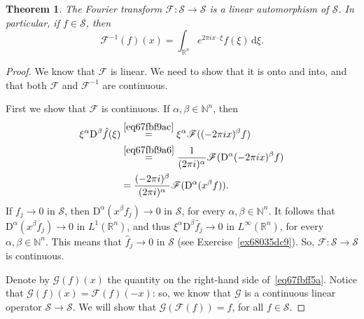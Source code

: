 \documentclass[a4paper,9pt]{amsart}
\newcommand{\scr}[1]{\mathscr{#1}}
\newcommand{\N}{\mathbb{N}}	%
\newcommand{\R}{\mathbb{R}}	%
\newcommand{\did}{\,\mathrm{d}}	%
\newcommand{\Diff}{\mathrm{D}}
\theoremstyle{plain}
\newtheorem{theorem}[proposition]{Theorem}
\theoremstyle{definition}
\theoremstyle{remark}
\begin{document}
\begin{theorem}\label{thm67fcdb1f}
	The Fourier transform $\scr F:\scr S\to\scr S$ is a linear automorphism of $\scr S$.
	In particular, if $f\in\scr S$, then 
	\begin{equation}\label{eq67fbff5a}
		\scr F^{-1}(f)(x) = \int_{\R^n} e^{2\pi i x\cdot\xi} f(\xi) \did \xi .
	\end{equation}
\end{theorem}
\begin{proof}
	We know that $\scr F$ is linear.
	We need to show that it is onto and into, and that both $\scr F$ and $\scr F^{-1}$ are continuous.
	
	First we show that $\scr F$ is continuous.
	If $\alpha,\beta\in\N^n$, then 
	\begin{align}
		\xi^\alpha \Diff^\beta \hat f(\xi)
		&\overset{\eqref{eq67fbf9ac}}= \xi^\alpha \scr F((-2\pi i x)^\beta f) \\
		&\overset{\eqref{eq67fbf9a6}}= \frac{1}{(2\pi i)^\alpha} \scr F(\Diff^\alpha (-2\pi i x)^\beta f ) \\
		&= \frac{(-2\pi i)^\beta}{(2\pi i)^\alpha} \scr F(\Diff^\alpha  (x^\beta f) ) .
	\end{align}
	If $f_j\to0$ in $\scr S$, then $\Diff^\alpha  (x^\beta f_j)\to 0$ in $\scr S$, for every $\alpha,\beta\in\N^n$.
	It follows that $\Diff^\alpha  (x^\beta f_j)\to 0$ in $L^1(\R^n)$, and thus 
	$\xi^\alpha \Diff^\beta \hat f_j\to 0$ in $L^\infty(\R^n)$, for every $\alpha,\beta\in\N^n$.
	This means that $\hat f_j\to 0$ in $\scr S$ (see Exercise~\ref{ex68035dc9}).
	So, $\scr F:\scr S\to\scr S$ is continuous.
	
	Denote by $\scr G(f)(x)$ the quantity on the right-hand side of~\eqref{eq67fbff5a}.
	Notice that $\scr G(f)(x)= \scr F(f)(-x)$: so, we know that $\scr G$ is a continuous linear operator $\scr S\to\scr S$.
	We will show that $\scr G(\scr F(f)) = f$, for all $f\in\scr S$.
	

\end{proof}
\end{document}
